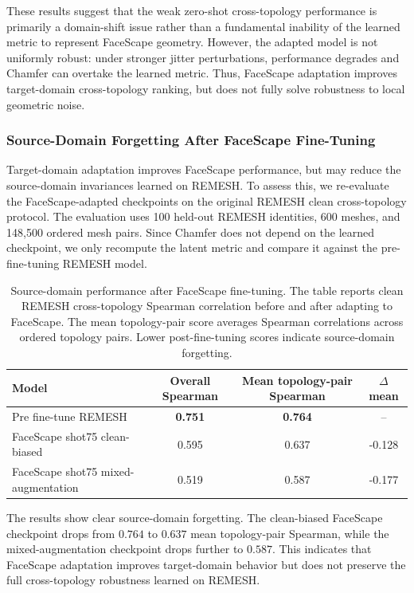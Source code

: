 These results suggest that the weak zero-shot cross-topology performance is
primarily a domain-shift issue rather than a fundamental inability of the learned
metric to represent FaceScape geometry. However, the adapted model is not
uniformly robust: under stronger jitter perturbations, performance degrades and
Chamfer can overtake the learned metric. Thus, FaceScape adaptation improves
target-domain cross-topology ranking, but does not fully solve robustness to
local geometric noise.

\subsubsection{Source-Domain Forgetting After FaceScape Fine-Tuning}
\label{app:faceverse_forgetting}

Target-domain adaptation improves FaceScape performance, but may reduce the
source-domain invariances learned on REMESH. To assess this, we re-evaluate the
FaceScape-adapted checkpoints on the original REMESH clean cross-topology
protocol. The evaluation uses 100 held-out REMESH identities, 600 meshes, and
148,500 ordered mesh pairs. Since Chamfer does not depend on the learned
checkpoint, we only recompute the latent metric and compare it against the
pre-fine-tuning REMESH model.

\begin{table}[h]
\centering
\small
\caption{
Source-domain performance after FaceScape fine-tuning. The table reports clean
REMESH cross-topology Spearman correlation before and after adapting to
FaceScape. The mean topology-pair score averages Spearman correlations across
ordered topology pairs. Lower post-fine-tuning scores indicate source-domain
forgetting.
}
\label{tab:faceverse_finetune_forgetting_app}
\begin{tabular}{lccc}
\toprule
Model & Overall Spearman & Mean topology-pair Spearman & $\Delta$ mean \\
\midrule
Pre fine-tune REMESH & \textbf{0.751} & \textbf{0.764} & -- \\
FaceScape shot75 clean-biased & 0.595 & 0.637 & -0.128 \\
FaceScape shot75 mixed-augmentation & 0.519 & 0.587 & -0.177 \\
\bottomrule
\end{tabular}
\end{table}

The results show clear source-domain forgetting. The clean-biased FaceScape
checkpoint drops from $0.764$ to $0.637$ mean topology-pair Spearman, while the
mixed-augmentation checkpoint drops further to $0.587$. This indicates that
FaceScape adaptation improves target-domain behavior but does not preserve the
full cross-topology robustness learned on REMESH.

